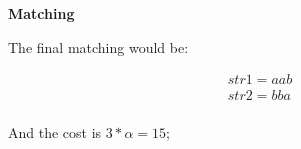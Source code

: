 \textbf{Matching}

The final matching would be:

\begin{align}
    str1 = a a b \\
    str2 = b b a \\
\end{align}

And the cost is $3 * \alpha = 15$;